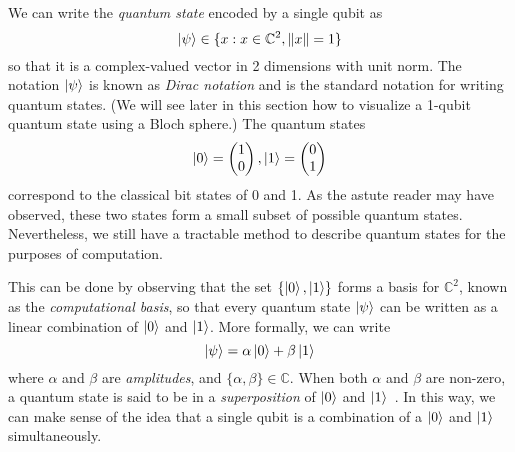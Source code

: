 We can write the \emph{quantum state} encoded by a single qubit as
\begin{equation}
    \ket{\psi} \in \{ x : x \in \mathbb{C}^2, \norm{x} = 1 \}
\end{equation}
so that it is a complex-valued vector in 2 dimensions with unit norm. The notation $\ket{\psi}$ is known as \emph{Dirac notation} and is the standard notation for writing quantum states. (We will see later in this section how to visualize a 1-qubit quantum state using a Bloch sphere.) The quantum states
\begin{equation}
\ket{0} = \begin{pmatrix}
1 \\
0
\end{pmatrix}, 
\ket{1}= \begin{pmatrix}
0 \\
1
\end{pmatrix}
\end{equation}
correspond to the classical bit states of 0 and 1. As the astute reader may have observed, these two states form a small subset of possible quantum states. Nevertheless, we still have a tractable method to describe quantum states for the purposes of computation.

This can be done by observing that the set $\{ \ket{0}, \ket{1} \}$ forms a basis for $\mathbb{C}^2$, known as the \emph{computational basis}, so that every quantum state $\ket{\psi}$ can be written as a linear combination of $\ket{0}$ and $\ket{1}$. More formally, we can write
\begin{equation}
\ket{\psi} = \alpha\ket{0} + \beta\ket{1}
\label{eq:qubit-state}
\end{equation}
where $\alpha$ and $\beta$ are \emph{amplitudes}, and
$\lbrace  \alpha,\beta \rbrace \in \mathbb{C}$. When both $\alpha$ and $\beta$ are non-zero, a quantum state is said to be in a \emph{superposition} of $\ket{0}$ and $\ket{1}$~\cite{Nielsen:Quantum:2010}. In this way, we can make sense of the idea that a single qubit is a combination of a $\ket{0}$ and $\ket{1}$ simultaneously. 

